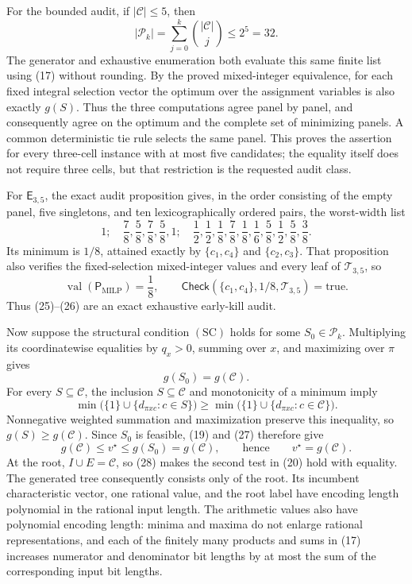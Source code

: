 For the bounded audit, if \(|\mathcal C|\leq5\), then
\[
|\mathcal P_k|=\sum_{j=0}^{k}{|\mathcal C|\choose j}\leq2^5=32.       \tag{24}
\]
The generator and exhaustive enumeration both evaluate this same finite
list using (17) without rounding.  By the proved mixed-integer equivalence,
for each fixed integral selection vector the optimum over the assignment
variables is also exactly \(g(S)\).  Thus the three computations agree
panel by panel, and consequently agree on the optimum and the complete set
of minimizing panels.  A common deterministic tie rule selects the same
panel.  This proves the assertion for every three-cell instance with at
most five candidates; the equality itself does not require three cells,
but that restriction is the requested audit class.

For \(\mathsf E_{3,5}\), the exact audit proposition gives, in the order
consisting of the empty panel, five singletons, and ten lexicographically
ordered pairs, the worst-width list
\[
1;\quad
\frac78,\frac58,\frac78,\frac58,1;\quad
\frac12,\frac12,\frac18,\frac78,\frac18,
\frac16,\frac58,\frac12,\frac58,\frac38.                              \tag{25}
\]
Its minimum is \(1/8\), attained exactly by
\(\{c_1,c_4\}\) and \(\{c_2,c_3\}\).  That proposition also verifies
the fixed-selection mixed-integer values and every leaf of
\(\mathcal T_{3,5}\), so
\[
\operatorname{val}(\mathsf P_{\mathrm{MILP}})=\frac18,
\qquad
\mathsf{Check}(\{c_1,c_4\},1/8,\mathcal T_{3,5})=\mathrm{true}.        \tag{26}
\]
Thus (25)--(26) are an exact exhaustive early-kill audit.

Now suppose the structural condition \(\mathrm{(SC)}\) holds for some
\(S_0\in\mathcal P_k\).  Multiplying its coordinatewise equalities by
\(q_x>0\), summing over \(x\), and maximizing over \(\pi\) gives
\[
g(S_0)=g(\mathcal C).                                                   \tag{27}
\]
For every \(S\subseteq\mathcal C\), the inclusion
\(S\subseteq\mathcal C\) and monotonicity of a minimum imply
\[
\min\bigl(\{1\}\cup\{d_{\pi xc}:c\in S\}\bigr)
\geq
\min\bigl(\{1\}\cup\{d_{\pi xc}:c\in\mathcal C\}\bigr).
\]
Nonnegative weighted summation and maximization preserve this inequality,
so \(g(S)\geq g(\mathcal C)\).  Since \(S_0\) is feasible, (19) and (27)
therefore give
\[
g(\mathcal C)\leq v^\star\leq g(S_0)=g(\mathcal C),
\qquad\text{hence}\qquad v^\star=g(\mathcal C).                      \tag{28}
\]
At the root, \(I\cup E=\mathcal C\), so (28) makes the second test in
(20) hold with equality.  The generated tree consequently consists only
of the root.  Its incumbent characteristic vector, one rational value, and
the root label have encoding length polynomial in the rational input
length.  The arithmetic values also have polynomial encoding length:
minima and maxima do not enlarge rational representations, and each of the
finitely many products and sums in (17) increases numerator and denominator
bit lengths by at most the sum of the corresponding input bit lengths.

